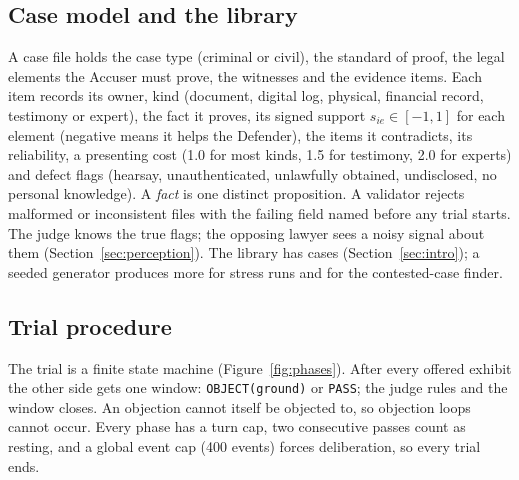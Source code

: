 \subsection{Case model and the library}
A case file holds the case type (criminal or civil), the standard of proof, the legal elements the Accuser must prove, the witnesses and the evidence items. Each item records its owner, kind (document, digital log, physical, financial record, testimony or expert), the fact it proves, its signed support $s_{ie}\in[-1,1]$ for each element (negative means it helps the Defender), the items it contradicts, its reliability, a presenting cost (1.0 for most kinds, 1.5 for testimony, 2.0 for experts) and defect flags (hearsay, unauthenticated, unlawfully obtained, undisclosed, no personal knowledge). A \emph{fact} is one distinct proposition. A validator rejects malformed or inconsistent files with the failing field named before any trial starts. The judge knows the true flags; the opposing lawyer sees a noisy signal about them (Section~\ref{sec:perception}). The library has \NCases{} cases (Section~\ref{sec:intro}); a seeded generator produces more for stress runs and for the contested-case finder.

\subsection{Trial procedure}
The trial is a finite state machine (Figure~\ref{fig:phases}). After every offered exhibit the other side gets one window: \texttt{OBJECT(ground)} or \texttt{PASS}; the judge rules and the window closes. An objection cannot itself be objected to, so objection loops cannot occur. Every phase has a turn cap, two consecutive passes count as resting, and a global event cap (400 events) forces deliberation, so every trial ends.

